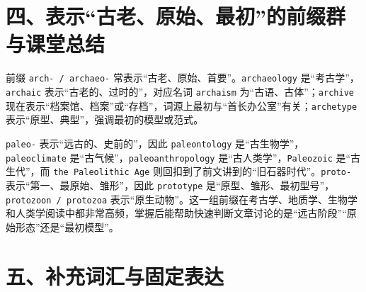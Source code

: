\documentclass[UTF8,zihao=-4]{ctexart}
\begin{document}
\section*{四、表示“古老、原始、最初”的前缀群与课堂总结}

前缀 \texttt{arch- / archaeo-} 常表示“古老、原始、首要”。\texttt{archaeology} 是“考古学”，\texttt{archaic} 表示“古老的、过时的”，对应名词 \texttt{archaism} 为“古语、古体”；\texttt{archive} 现在表示“档案馆、档案”或“存档”，词源上最初与“首长办公室”有关；\texttt{archetype} 表示“原型、典型”，强调最初的模型或范式。

\texttt{paleo-} 表示“远古的、史前的”，因此 \texttt{paleontology} 是“古生物学”，\texttt{paleoclimate} 是“古气候”，\texttt{paleoanthropology} 是“古人类学”，\texttt{Paleozoic} 是“古生代”，而 \texttt{the Paleolithic Age} 则回扣到了前文讲到的“旧石器时代”。\texttt{proto-} 表示“第一、最原始、雏形”，因此 \texttt{prototype} 是“原型、雏形、最初型号”，\texttt{protozoon / protozoa} 表示“原生动物”。这一组前缀在考古学、地质学、生物学和人类学阅读中都非常高频，掌握后能帮助快速判断文章讨论的是“远古阶段”“原始形态”还是“最初模型”。

\section*{五、补充词汇与固定表达}
\end{document}
